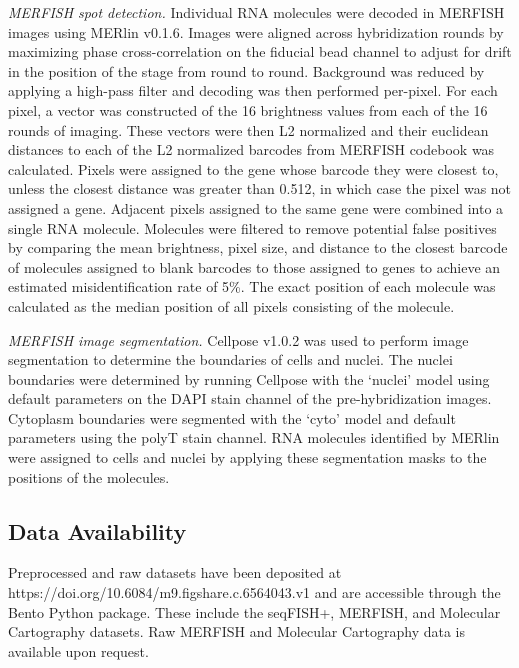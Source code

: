 \textit{MERFISH spot detection.} Individual RNA molecules were decoded in MERFISH images using MERlin v0.1.6\cite{ZhuangLabMERlinMERlin}. Images were aligned across hybridization rounds by maximizing phase cross-correlation on the fiducial bead channel to adjust for drift in the position of the stage from round to round. Background was reduced by applying a high-pass filter and decoding was then performed per-pixel. For each pixel, a vector was constructed of the 16 brightness values from each of the 16 rounds of imaging. These vectors were then L2 normalized and their euclidean distances to each of the L2 normalized barcodes from MERFISH codebook was calculated. Pixels were assigned to the gene whose barcode they were closest to, unless the closest distance was greater than 0.512, in which case the pixel was not assigned a gene. Adjacent pixels assigned to the same gene were combined into a single RNA molecule. Molecules were filtered to remove potential false positives by comparing the mean brightness, pixel size, and distance to the closest barcode of molecules assigned to blank barcodes to those assigned to genes to achieve an estimated misidentification rate of 5\%. The exact position of each molecule was calculated as the median position of all pixels consisting of the molecule.

\textit{MERFISH image segmentation.} Cellpose v1.0.2\cite{stringerCellposeGeneralistAlgorithm2021} was used to perform image segmentation to determine the boundaries of cells and nuclei. The nuclei boundaries were determined by running Cellpose with the `nuclei' model using default parameters on the DAPI stain channel of the pre-hybridization images. Cytoplasm boundaries were segmented with the `cyto' model and default parameters using the polyT stain channel. RNA molecules identified by MERlin were assigned to cells and nuclei by applying these segmentation masks to the positions of the molecules.

\subsection{Data Availability}
Preprocessed and raw datasets have been deposited at \newline https://doi.org/10.6084/m9.figshare.c.6564043.v1 and are accessible through the Bento Python package. These include the seqFISH+\cite{engTranscriptomescaleSuperresolvedImaging2019}, MERFISH, and Molecular Cartography datasets. Raw MERFISH and Molecular Cartography data is available upon request.

